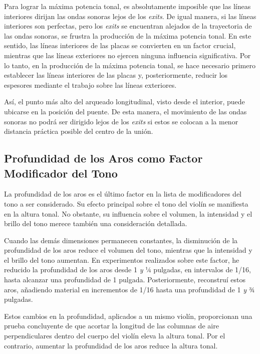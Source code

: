 \documentclass[12pt]{book}
\begin{document}
Para lograr la máxima potencia tonal, es absolutamente imposible que las líneas interiores dirijan las ondas sonoras lejos de los \textit{exits}. De igual manera, si las líneas interiores son perfectas, pero los \textit{exits} se encuentran alejados de la trayectoria de las ondas sonoras, se frustra la producción de la máxima potencia tonal. En este sentido, las líneas interiores de las placas se convierten en un factor crucial, mientras que las líneas exteriores no ejercen ninguna influencia significativa. Por lo tanto, en la producción de la máxima potencia tonal, se hace necesario primero establecer las líneas interiores de las placas y, posteriormente, reducir los espesores mediante el trabajo sobre las líneas exteriores.

Así, el punto más alto del arqueado longitudinal, visto desde el interior, puede ubicarse en la posición del puente. De esta manera, el movimiento de las ondas sonoras no podrá ser dirigido lejos de los \textit{exits} si estos se colocan a la menor distancia práctica posible del centro de la unión.

\subsection*{Profundidad de los Aros como Factor Modificador del Tono}

La profundidad de los aros es el último factor en la lista de modificadores del tono a ser considerado. Su efecto principal sobre el tono del violín se manifiesta en la altura tonal. No obstante, su influencia sobre el volumen, la intensidad y el brillo del tono merece también una consideración detallada.

Cuando las demás dimensiones permanecen constantes, la disminución de la profundidad de los aros reduce el volumen del tono, mientras que la intensidad y el brillo del tono aumentan. En experimentos realizados sobre este factor, he reducido la profundidad de los aros desde 1 \textit{y} ¼ pulgadas, en intervalos de 1/16, hasta alcanzar una profundidad de 1 pulgada. Posteriormente, reconstruí estos aros, añadiendo material en incrementos de 1/16 hasta una profundidad de 1 \textit{y} ¾ pulgadas.

Estos cambios en la profundidad, aplicados a un mismo violín, proporcionan una prueba concluyente de que acortar la longitud de las columnas de aire perpendiculares dentro del cuerpo del violín eleva la altura tonal. Por el contrario, aumentar la profundidad de los aros reduce la altura tonal.
\end{document}
